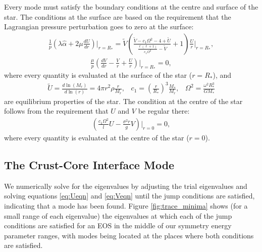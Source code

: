 \documentclass[fleqn,usenatbib]{mnras}
\begin{document}
Every mode must satisfy the boundary conditions at the centre and surface of the star. The conditions at the surface are based on the requirement that the Lagrangian pressure perturbation goes to zero at the surface:
\begin{align}
\frac{1}{p}\left(\lambda\hat{\alpha}+2\mu\frac{dU}{dr}\right)\biggr\rvert_{r=R_{*}}=\tilde{V}\left(\frac{\tilde{V}-c_1\Omega^2-4+\tilde{U}}{\frac{\ell(\ell+1)}{c_1\Omega^2}-\tilde{V}}+1\right)\frac{U}{r}\biggr\rvert_{r=R_{*}},
\label{eq:surface_boundary_modified_1}
\end{align}
\begin{align}
\frac{\mu}{p}\left(\frac{dV}{dr}-\frac{V}{r}+\frac{U}{r}\right)\biggr\rvert_{r=R_{*}}=0,
\label{eq:surface_boundary_modified_2}
\end{align}
\noindent where every quantity is evaluated at the surface of the star ($r=R_*$), and 
\begin{align}\nonumber
\tilde{U}=\frac{d\ln\left(M_r\right)}{d\ln\left(r\right)}=4\pi r^2\rho\frac{r}{M_r},\;\;\;c_1=\left(\frac{r}{R_*}\right)^3\frac{M_*}{M_r},\;\;\;\Omega^2=\frac{\omega^2R_*^3}{GM_*}
\end{align}
\noindent are equilibrium properties of the star. The condition at the centre of the star follows from the requirement that $U$ and $V$ be regular there:
\begin{align}
\left(\frac{c_1\Omega^2}{l}U-\frac{\sigma^2r}{g}V\right)\biggr\rvert_{r=0}=0,
\label{eq:core_condition}
\end{align}
\noindent where every quantity is evaluated at the centre of the star ($r=0$).











\subsection{The Crust-Core Interface Mode}
\hspace{\parindent}We numerically solve for the eigenvalues by adjusting the trial eigenvalues and solving equations \ref{eq:Ueqn} and \ref{eq:Veqn} until the jump conditions are satisfied, indicating that a mode has been found. Figure \ref{fig:trace_minima} shows (for a small range of each eigenvalue) the eigenvalues at which each of the jump conditions are satisfied for an EOS in the middle of our symmetry energy parameter ranges, with modes being located at the places where both conditions are satisfied.
\end{document}
